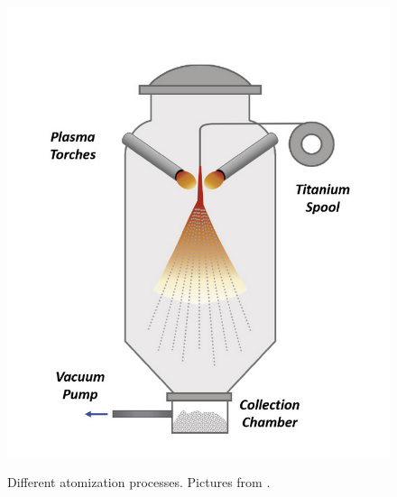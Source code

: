 \begin{figure}[H]
{        \includegraphics[scale=0.4]{Images/plasma.png}
    }
    \qquad
    
    \caption[Atomization processes]{Different atomization processes. Pictures from \cite{material_technology_innovations_co_rotating_nodate, material_technology_innovations_co_water_nodate, material_technology_innovations_co_gas_nodate, inovar_communications_ltd_metal_2020}.}
    \label{fig:atom}
\end{figure}

